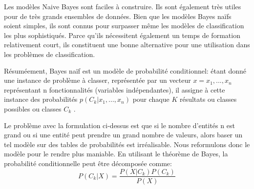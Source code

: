 Les modèles Naive Bayes sont faciles à construire. Ils sont également très utiles pour de très grands ensembles de données. Bien que les modèles Bayes naïfs soient simples, ils sont connus pour surpasser même les modèles de classification les plus sophistiqués. Parce qu'ils nécessitent également un temps de formation relativement court, ils constituent une bonne alternative pour une utilisation dans les problèmes de classification.

Résuméement, Bayes naïf est un modèle de probabilité conditionnel: étant donné une instance de problème à classer, représentée par un vecteur $x=x_{1},...,x_{n}$  représentant n fonctionnalités (variables indépendantes), il assigne à cette instance des probabilités ${p(C_{k}| x_{1},...,x_{n})}$ pour chaque $K$ résultats ou classes possibles ou classes $C_{k}$ \cite{murty2011pattern}.

Le problème avec la formulation ci-dessus est que si le nombre d'entités n est grand ou si une entité peut prendre un grand nombre de valeurs, alors baser un tel modèle sur des tables de probabilités est irréalisable. Nous reformulons donc le modèle pour le rendre plus maniable. En utilisant le théorème de Bayes, la probabilité conditionnelle peut être décomposée comme:
\begin{equation}
    P(C_{k} | X)=\frac{P(X | C_{k}) P(C_{k})}{P(X)}
\end{equation}

